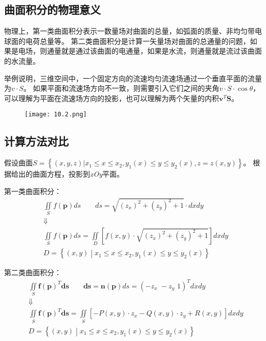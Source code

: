 \subsection{曲面积分的物理意义}

物理上，第一类曲面积分表示一数量场对曲面的总量，如弧面的质量、非均匀带电球面的电荷总量等。
第二类曲面积分是计算一矢量场对曲面的总通量的问题，如果是电场，则通量就是通过该曲面的电通量，如果是水流，则通量就是流过该曲面的水流量。

举例说明，三维空间中，一个固定方向的流速均匀流速场通过一个垂直平面的流量为$v\cdot S$。
如果平面和流速场方向不一致，则需要引入它们之间的夹角$v\cdot S\cdot \cos \theta $，可以理解为平面在流速场方向的投影，也可以理解为两个矢量的内积$\boldsymbol{v}^T\boldsymbol{S}$。

\begin{figure}[h]
\centering
\texttt{[image: 10.2.png]}
\end{figure}

\subsection{计算方法对比}

假设曲面$S=\left\{ \left( x,y,z \right) |x_1\leqslant x\leqslant x_2,y_1\left( x \right) \leqslant y\leqslant y_2\left( x \right) ,z=z\left( x,y \right) \right\} $。
根据给出的曲面方程，投影到{\it xOy}平面。

第一类曲面积分：
\begin{align*}
&\iint\limits_S{f\left( \boldsymbol{p} \right) ds} \qquad ds=\sqrt{\left( z_x \right) ^2+\left( z_y \right) ^2+1}\cdot dxdy \\
&\Downarrow \\
&\iint\limits_S{f\left( \boldsymbol{p} \right) ds}=\iint\limits_D{\left[ f\left( x,y \right) \cdot \sqrt{\left( z_x \right) ^2+\left( z_y \right) ^2+1} \right] dxdy} \\
&D=\left\{ \left( x,y \right) \middle| x_1\leqslant x\leqslant x_2,y_1\left( x \right) \leqslant y\leqslant y_2\left( x \right) \right\}
\end{align*}

第二类曲面积分：
\begin{align*}
&\iint\limits_S{\boldsymbol{f}\left( \boldsymbol{p} \right) ^T\boldsymbol{ds}} \qquad \boldsymbol{ds}=\mathbf{n}\left( \boldsymbol{p} \right) ds=\left( -z_x\,\,-z_y\,\,1 \right) ^Tdxdy \\
&\Downarrow \\
&\iint\limits_S{\boldsymbol{f}\left( \boldsymbol{p} \right) ^T\boldsymbol{ds}}=\iint\limits_S{\left[ -P\left( x,y \right) \cdot z_x-Q\left( x,y \right) \cdot z_y+R\left( x,y \right) \right] dxdy} \\
&D=\left\{ \left( x,y \right) \middle| x_1\leqslant x\leqslant x_2,y_1\left( x \right) \leqslant y\leqslant y_2\left( x \right) \right\}
\end{align*}




